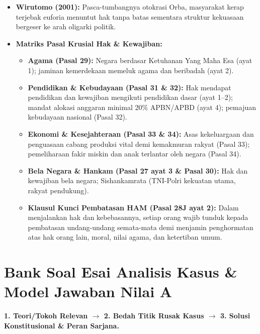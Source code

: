 \documentclass[10pt,a4paper]{article}
\begin{document}
\begin{conceptbox}
\begin{itemize}
  \item \textbf{Wirutomo (2001):} Pasca-tumbangnya otokrasi Orba, masyarakat kerap terjebak euforia menuntut hak tanpa batas sementara struktur kekuasaan bergeser ke arah oligarki politik.
  \item \textbf{Matriks Pasal Krusial Hak \& Kewajiban:}
  \begin{itemize}
    \item \textbf{Agama (Pasal 29):} Negara berdasar Ketuhanan Yang Maha Esa (ayat 1); jaminan kemerdekaan memeluk agama dan beribadah (ayat 2).
    \item \textbf{Pendidikan \& Kebudayaan (Pasal 31 \& 32):} Hak mendapat pendidikan dan kewajiban mengikuti pendidikan dasar (ayat 1--2); mandat alokasi anggaran minimal 20\% APBN/APBD (ayat 4); pemajuan kebudayaan nasional (Pasal 32).
    \item \textbf{Ekonomi \& Kesejahteraan (Pasal 33 \& 34):} Asas kekeluargaan dan penguasaan cabang produksi vital demi kemakmuran rakyat (Pasal 33); pemeliharaan fakir miskin dan anak terlantar oleh negara (Pasal 34).
    \item \textbf{Bela Negara \& Hankam (Pasal 27 ayat 3 \& Pasal 30):} Hak dan kewajiban bela negara; Sishankamrata (TNI-Polri kekuatan utama, rakyat pendukung).
    \item \textbf{Klausul Kunci Pembatasan HAM (Pasal 28J ayat 2):} Dalam menjalankan hak dan kebebasannya, setiap orang wajib tunduk kepada pembatasan undang-undang semata-mata demi menjamin penghormatan atas hak orang lain, moral, nilai agama, dan ketertiban umum.
  \end{itemize}
\end{itemize}
\end{conceptbox}

\section*{Bank Soal Esai Analisis Kasus \& Model Jawaban Nilai A}

\begin{examtipbox}
\textbf{1. Teori/Tokoh Relevan $\rightarrow$ 2. Bedah Titik Rusak Kasus $\rightarrow$ 3. Solusi Konstitusional \& Peran Sarjana.}
\end{examtipbox}
\end{document}

